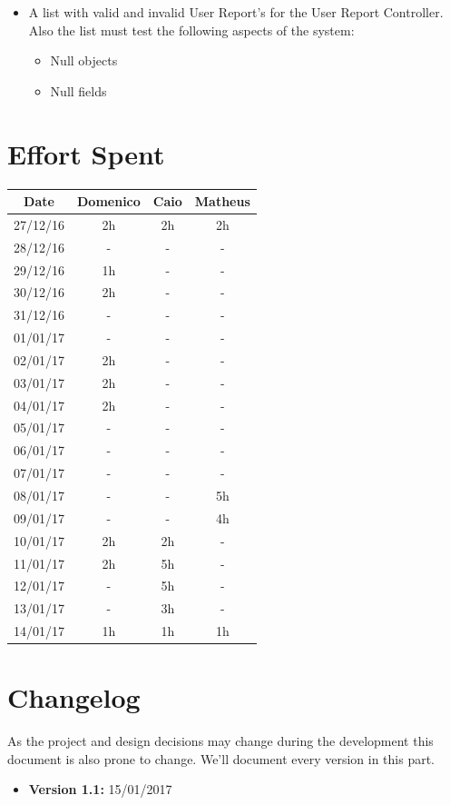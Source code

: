 \documentclass[a4paper]{article}
\begin{document}
\begin{itemize}
\item A list with valid and invalid User Report's for the User Report Controller. Also the list must test the following aspects of the system:
\begin{itemize}
     \item Null objects
     \item Null fields
     \end{itemize}
  

\end{itemize}  
\newpage
\section{Effort Spent}
\begin{tabular}{ | c | c | c | c | }
\hline
	\textbf {Date} & \textbf {Domenico} & \textbf {Caio} & \textbf {Matheus} \\ \hline
	27/12/16& 2h & 2h & 2h  \\ \hline
	28/12/16& - & - & - \\ \hline
	29/12/16& 1h & - & - \\ \hline
	30/12/16& 2h & - & - \\ \hline
	31/12/16& - & - & - \\ \hline
	01/01/17& - & - & - \\ \hline
	02/01/17& 2h & - & - \\ \hline
	03/01/17& 2h & - & - \\ \hline
	04/01/17& 2h & - & - \\ \hline
	05/01/17& - & - & - \\ \hline
	06/01/17& - & - & - \\ \hline
	07/01/17& - & - & - \\ \hline
	08/01/17& - & - & 5h \\ \hline
	09/01/17& - & - & 4h \\ \hline
	10/01/17& 2h & 2h & - \\ \hline
	11/01/17& 2h & 5h & - \\ \hline
	12/01/17& - & 5h & - \\ \hline
	13/01/17& - & 3h & - \\ \hline
	14/01/17& 1h & 1h & 1h \\ \hline
\end{tabular}
\newpage

\section{Changelog}
As the project and design decisions may change during the development this document is also prone to change.
We'll document every version in this part.
\begin{itemize}
\item \textbf {Version 1.1:} 15/01/2017
\end{itemize}
\end{document}
